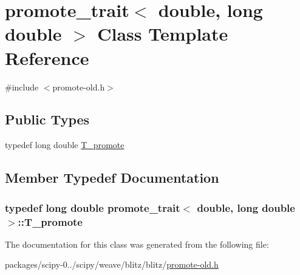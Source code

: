\hypertarget{classpromote__trait_3_01double_00_01long_01double_01_4}{}\section{promote\+\_\+trait$<$ double, long double $>$ Class Template Reference}
\label{classpromote__trait_3_01double_00_01long_01double_01_4}


{\ttfamily \#include $<$promote-\/old.\+h$>$}

\subsection*{Public Types}
\begin{DoxyCompactItemize}
\item 
typedef long double \hyperlink{classpromote__trait_3_01double_00_01long_01double_01_4_a36929ba3e8b28ebbb63f6c1af6937fac}{T\+\_\+promote}
\end{DoxyCompactItemize}


\subsection{Member Typedef Documentation}
\hypertarget{classpromote__trait_3_01double_00_01long_01double_01_4_a36929ba3e8b28ebbb63f6c1af6937fac}{}
\subsubsection[{T\+\_\+promote}]{\setlength{\rightskip}{0pt plus 5cm}typedef long double {\bf promote\+\_\+trait}$<$ double, long double $>$\+::{\bf T\+\_\+promote}}\label{classpromote__trait_3_01double_00_01long_01double_01_4_a36929ba3e8b28ebbb63f6c1af6937fac}


The documentation for this class was generated from the following file\+:\begin{DoxyCompactItemize}
\item 
packages/scipy-\/0../scipy/weave/blitz/blitz/\hyperlink{promote-old_8h}{promote-\/old.\+h}\end{DoxyCompactItemize}
